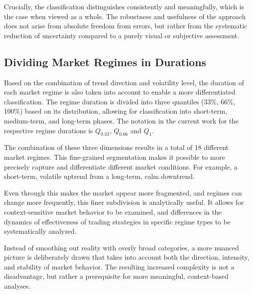 Crucially, the classification distinguishes consistently and meaningfully, which is the case when viewed as a whole.
The robustness and usefulness of the approach does not arise from absolute freedom from errors, but rather from the systematic reduction of uncertainty compared to a purely visual or subjective assessment.

\subsection{Dividing Market Regimes in Durations}

Based on the combination of trend direction and volatility level, the duration of each market regime is also taken into account to enable a more differentiated classification.
The regime duration is divided into three quantiles (33\%, 66\%, 100\%) based on its distribution, allowing for classification into short-term, medium-term, and long-term phases.
The notation in the current work for the respective regime durations is $Q_{0.33}$, $Q_{0.66}$ and $Q_{1}$.

The combination of these three dimensions results in a total of 18 different market regimes.
This fine-grained segmentation makes it possible to more precisely capture and differentiate different market conditions.
For example, a short-term, volatile uptrend from a long-term, calm downtrend.

Even through this makes the market appear more fragmented, and regimes can change more frequently, this finer subdivision is analytically useful.
It allows for context-sensitive market behavior to be examined, and differences in the dynamics of effectiveness of trading strategies in specific regime types to be systematically analyzed.

Instead of smoothing out reality with overly broad categories, a more nuanced picture is deliberately drawn that takes into account both the direction, intensity, and stability of market behavior.
The resulting increased complexity is not a disadvantage, but rather a prerequisite for more meaningful, context-based analyses.

